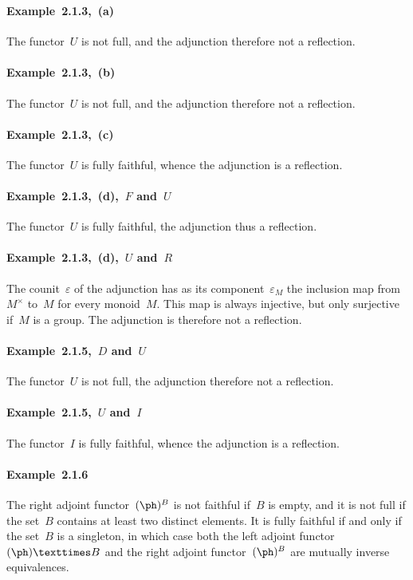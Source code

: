 \subsubsection{}

\paragraph{Example~2.1.3,~(a)}
The functor~$U$ is not full, and the adjunction therefore not a reflection.

\paragraph{Example~2.1.3,~(b)}
The functor~$U$ is not full, and the adjunction therefore not a reflection.

\paragraph{Example~2.1.3,~(c)}
The functor~$U$ is fully faithful, whence the adjunction is a reflection.

\paragraph{Example~2.1.3,~(d),~$F$ and~$U$}
The functor~$U$ is fully faithful, the adjunction thus a reflection.

\paragraph{Example~2.1.3,~(d),~$U$ and~$R$}
The counit~$ε$ of the adjunction has as its component~$ε_M$ the inclusion map from~$M^×$ to~$M$ for every monoid~$M$.
This map is always injective, but only surjective if~$M$ is a group.
The adjunction is therefore not a reflection.

\paragraph{Example~2.1.5,~$D$ and~$U$}
The functor~$U$ is not full, the adjunction therefore not a reflection.

\paragraph{Example~2.1.5,~$U$ and~$I$}
The functor~$I$ is fully faithful, whence the adjunction is a reflection.

\paragraph{Example~2.1.6}
The right adjoint functor~$(\ph)^B$ is not faithful if~$B$ is empty, and it is not full if the set~$B$ contains at least two distinct elements.
It is fully faithful if and only if the set~$B$ is a singleton, in which case both the left adjoint functor~$(\ph) × B$ and the right adjoint functor~$(\ph)^B$ are mutually inverse equivalences.
